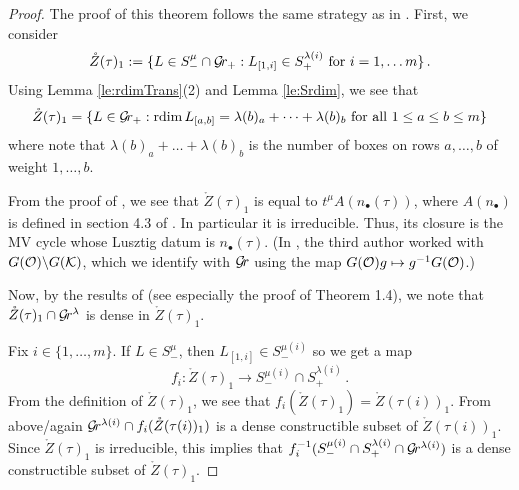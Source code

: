 \documentclass{article} %
\begin{document}
\begin{proof}
    The proof of this theorem follows the same strategy as in \cite{dranowski2020generalized}.
% 
First, we consider 
\begin{equation*}
\mathring Z(\tau)_1 := \{ L \in S^\mu_- \cap \mathcal{G}\!r_+ : L_{[1,i]} \in S_+^{\lambda(i)} \text{ for } i = 1, \dots m\} \,. 
\end{equation*}
% 
Using Lemma \ref{le:rdimTrans}(2) and Lemma \ref{le:Srdim}, we see that
$$
\mathring Z(\tau)_1 = \{ L \in \mathcal{G}\!r_+ : \operatorname{rdim} L_{[a,b]} = \lambda(b)_a + \dots + \lambda(b)_b \text{ for all $ 1 \le a \le b \le m $} \}
$$
where note that $ \lambda(b)_a + \dots + \lambda(b)_b$ is the number of boxes on rows $ a, \dots, b$ of weight $ 1, \dots, b $.

From  the proof of \cite[Proposition 9.6]{kamnitzer2010mirkovic}, we see that $ \mathring Z(\tau)_1$ is equal to $ t^\mu A(n_\bullet(\tau))$, where $ A(n_\bullet)$ is defined in section 4.3 of \cite{kamnitzer2010mirkovic}. In particular it is irreducible. Thus, its closure is the MV cycle whose Lusztig datum is $ n_\bullet(\tau) $. (In \cite{kamnitzer2010mirkovic}, the third author worked with $  G(\mathcal O) \backslash G(\mathcal K)$, which we identify with $ \mathcal{G}\!r $ using the map $ G(\mathcal O) g \mapsto g^{-1} G(\mathcal O)$.) 

Now, by the results of \cite{kamnitzerfibreshives} (see especially the proof of Theorem 1.4), we note that $\mathring Z(\tau)_1\cap \mathcal{G}\!r^\lambda$ is dense in $ \mathring Z(\tau)_1$. 

Fix $ i \in \{1, \dots, m\}$. If $ L \in S^\mu_-$, then $ L_{[1,i]} \in S^{\mu(i)}_-$ so we get a map 
$$ 
f_i : \mathring Z(\tau)_1 \rightarrow S^{\mu(i)}_- \cap S_+^{\lambda(i)} \,. 
$$
From the definition of $ \mathring Z(\tau)_1 $, we see that $ f_i(\mathring Z(\tau)_1 )= \mathring Z(\tau(i))_1$.  
From above/again $ \mathcal{G}\!r^{\lambda(i)} \cap f_i(\mathring Z(\tau(i))_1)$ is a dense constructible subset of $\mathring Z(\tau(i))_1$.  
Since $ \mathring Z(\tau)_1$ is irreducible, this implies that $ f_i^{-1}(S^{\mu(i)}_- \cap S_+^{\lambda(i)} \cap \mathcal{G}\!r^{\lambda(i)}) $ 
is a dense constructible subset of $ \mathring Z(\tau)_1 $.  


\end{proof}
\end{document}

